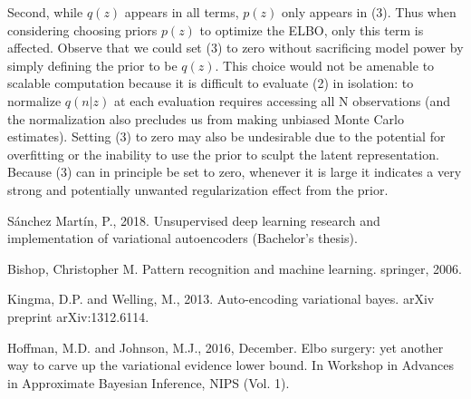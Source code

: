 \documentclass[5p,sort&compress]{elsarticle}
\begin{document}
Second, while $q(z)$ appears in all terms, $p(z)$ only appears in (3). Thus when considering choosing priors $p(z)$ to optimize the ELBO, only this term is affected. Observe that we could set (3) to zero without sacrificing model power by simply defining the prior to be $q(z)$. This choice would not be amenable to scalable computation because it is difficult to evaluate (2) in isolation: to normalize $q(n|z)$ at each evaluation requires accessing all N observations (and the normalization also precludes us from making unbiased Monte Carlo estimates). Setting (3) to zero may also be undesirable due to the potential for overfitting or the inability to use the prior to sculpt the latent representation. Because (3) can in principle be set to zero, whenever it is large it indicates a very strong and potentially unwanted regularization effect from the prior.




\begin{thebibliography}{9}

Sánchez Martín, P., 2018. Unsupervised deep learning research and implementation of variational autoencoders (Bachelor's thesis).

Bishop, Christopher M. Pattern recognition and machine learning. springer, 2006.

Kingma, D.P. and Welling, M., 2013. Auto-encoding variational bayes. arXiv preprint arXiv:1312.6114.

Hoffman, M.D. and Johnson, M.J., 2016, December. Elbo surgery: yet another way to carve up the variational evidence lower bound. In Workshop in Advances in Approximate Bayesian Inference, NIPS (Vol. 1).

\end{thebibliography}
\end{document}
